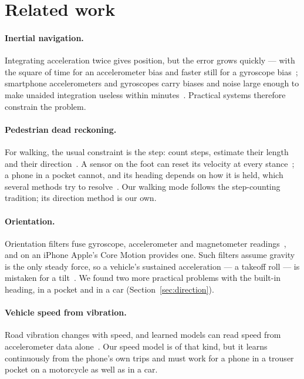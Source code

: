 \documentclass[11pt]{article}
\begin{document}
\section{Related work}\label{sec:related}

\paragraph{Inertial navigation.} Integrating acceleration twice gives position, but the error grows
quickly --- with the square of time for an accelerometer bias and faster still for a gyroscope
bias~\cite{groves}; smartphone accelerometers and
gyroscopes carry biases and noise large enough to make unaided integration useless within
minutes~\cite{memserrors}. Practical systems therefore constrain the problem.

\paragraph{Pedestrian dead reckoning.} For walking, the usual constraint is the step: count steps,
estimate their length and their direction~\cite{harle}. A sensor on the foot can reset its velocity
at every stance~\cite{foxlin}; a phone in a pocket cannot, and its heading depends on how it is
held, which several methods try to resolve~\cite{pdrheading}. Our walking mode follows the
step-counting tradition; its direction method is our own.

\paragraph{Orientation.} Orientation filters fuse gyroscope, accelerometer and magnetometer
readings~\cite{madgwick}, and on an iPhone Apple's Core Motion provides one. Such filters assume gravity is
the only steady force, so a vehicle's sustained acceleration --- a takeoff roll --- is mistaken for a
tilt~\cite{quatcf}. We found two more practical problems with the built-in heading, in a pocket and
in a car (Section~\ref{sec:direction}).

\paragraph{Vehicle speed from vibration.} Road vibration changes with speed, and learned models can
read speed from accelerometer data alone~\cite{carspeednet}. Our speed model is of that kind, but it
learns continuously from the phone's own trips and must work for a phone in a trouser pocket on a
motorcycle as well as in a car.
\end{document}
